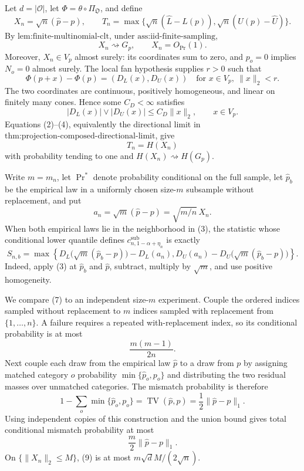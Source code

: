 Let \(d=|\mathcal O|\), let \(\Phi=\theta\circ\Pi_{\mathfrak O}\), and define
\[
X_n=\sqrt n(\widehat p-p),
\qquad
T_n=\max\{\sqrt n(\widehat L-L(p)),\sqrt n(U(p)-\widehat U)\}.
\tag{1}
\]
By \(\text{lem:finite-multinomial-clt}\), under \(\text{ass:iid-finite-sampling}\),
\[
X_n\rightsquigarrow G_p,
\qquad X_n=O_{\Pr}(1).
\tag{2}
\]
Moreover, \(X_n\in V_p\) almost surely: its coordinates sum to zero, and \(p_o=0\) implies \(N_o=0\) almost surely.  The local fan hypothesis supplies \(r>0\) such that
\[
\Phi(p+x)-\Phi(p)=(D_L(x),D_U(x))
\quad\text{for }x\in V_p,\ \|x\|_2<r.
\tag{3}
\]
The two coordinates are continuous, positively homogeneous, and linear on finitely many cones.  Hence some \(C_D<\infty\) satisfies
\[
|D_L(x)|\vee|D_U(x)|\leq C_D\|x\|_2,
\qquad x\in V_p.
\tag{4}
\]
Equations (2)--(4), equivalently the directional limit in \(\text{thm:projection-composed-directional-limit}\), give
\[
T_n=H(X_n)
\tag{5}
\]
with probability tending to one and \(H(X_n)\rightsquigarrow H(G_p)\).

Write \(m=m_n\), let \(\Pr^*\) denote probability conditional on the full sample, let \(\widehat p_b\) be the empirical law in a uniformly chosen size-\(m\) subsample without replacement, and put
\[
a_n=\sqrt m(\widehat p-p)=\sqrt{m/n}\,X_n.
\tag{6}
\]
When both empirical laws lie in the neighborhood in (3), the statistic whose conditional lower quantile defines \(c^{\mathrm{sub}}_{n,1-\alpha+\eta_n}\) is exactly
\[
S_{n,b}=\max\left\{
D_L\bigl(\sqrt m(\widehat p_b-p)\bigr)-D_L(a_n),
D_U(a_n)-D_U\bigl(\sqrt m(\widehat p_b-p)\bigr)
\right\}.
\tag{7}
\]
Indeed, apply (3) at \(\widehat p_b\) and \(\widehat p\), subtract, multiply by \(\sqrt m\), and use positive homogeneity.

We compare (7) to an independent size-\(m\) experiment.  Couple the ordered indices sampled without replacement to \(m\) indices sampled with replacement from \(\{1,\ldots,n\}\).  A failure requires a repeated with-replacement index, so its conditional probability is at most
\[
\frac{m(m-1)}{2n}.
\tag{8}
\]
Next couple each draw from the empirical law \(\widehat p\) to a draw from \(p\) by assigning matched category \(o\) probability \(\min\{\widehat p_o,p_o\}\) and distributing the two residual masses over unmatched categories.  The mismatch probability is therefore
\[
1-\sum_o\min\{\widehat p_o,p_o\}
=\operatorname{TV}(\widehat p,p)=\frac12\|\widehat p-p\|_1.
\]
Using independent copies of this construction and the union bound gives total conditional mismatch probability at most
\[
\frac m2\|\widehat p-p\|_1.
\tag{9}
\]
On \(\{\|X_n\|_2\leq M\}\), (9) is at most \(m\sqrt d M/(2\sqrt n)\).

